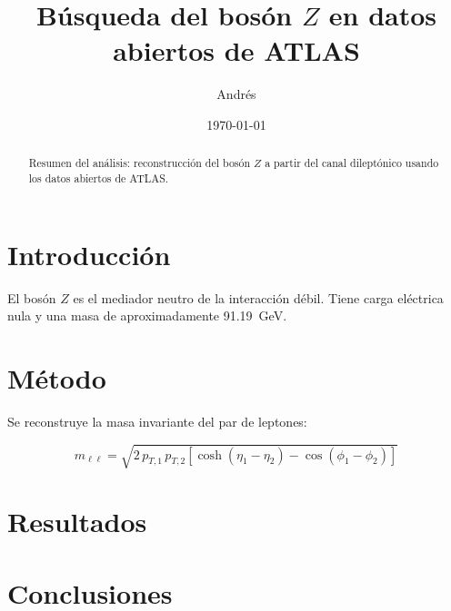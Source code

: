 \documentclass[11pt,a4paper]{article}
\title{Búsqueda del bosón $Z$ en datos abiertos de ATLAS}
\author{Andrés}
\date{\today}
\begin{document}
\maketitle

\begin{abstract}
Resumen del análisis: reconstrucción del bosón $Z$ a partir del canal
dileptónico usando los datos abiertos de ATLAS.
\end{abstract}

\section{Introducción}

El bosón $Z$ es el mediador neutro de la interacción débil. Tiene carga
eléctrica nula y una masa de aproximadamente \SI{91.19}{\giga\electronvolt}.

\section{Método}

Se reconstruye la masa invariante del par de leptones:

\begin{equation}
    m_{\ell\ell} = \sqrt{2\, p_{T,1}\, p_{T,2}
    \left[\cosh(\eta_1 - \eta_2) - \cos(\phi_1 - \phi_2)\right]}
\end{equation}

\section{Resultados}


\section{Conclusiones}
\end{document}
